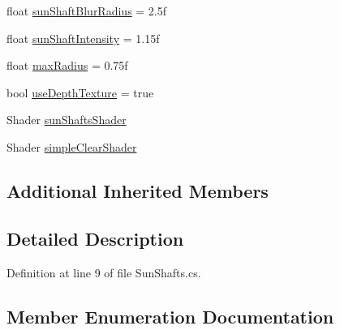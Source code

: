 \begin{DoxyCompactItemize}
float \mbox{\hyperlink{class_unity_standard_assets_1_1_image_effects_1_1_sun_shafts_a8bb5bab9e0ec911869fe77ccf5566d34}{sun\+Shaft\+Blur\+Radius}} = 2.\+5f
\item 
float \mbox{\hyperlink{class_unity_standard_assets_1_1_image_effects_1_1_sun_shafts_a7a45b2ff55145c73dbe893aeabff41ad}{sun\+Shaft\+Intensity}} = 1.\+15f
\item 
float \mbox{\hyperlink{class_unity_standard_assets_1_1_image_effects_1_1_sun_shafts_a2cccffc6bddcdc2fd32fbb6145bd408d}{max\+Radius}} = 0.\+75f
\item 
bool \mbox{\hyperlink{class_unity_standard_assets_1_1_image_effects_1_1_sun_shafts_ae9f2012110c36d04ac603df5317feb17}{use\+Depth\+Texture}} = true
\item 
Shader \mbox{\hyperlink{class_unity_standard_assets_1_1_image_effects_1_1_sun_shafts_a8e3768e277bb57d624799c8bd25b90e5}{sun\+Shafts\+Shader}}
\item 
Shader \mbox{\hyperlink{class_unity_standard_assets_1_1_image_effects_1_1_sun_shafts_a13cbc36500a9914640a900bd8c3936c9}{simple\+Clear\+Shader}}
\end{DoxyCompactItemize}
\subsection*{Additional Inherited Members}


\subsection{Detailed Description}


Definition at line 9 of file Sun\+Shafts.\+cs.



\subsection{Member Enumeration Documentation}
\mbox{\label{class_unity_standard_assets_1_1_image_effects_1_1_sun_shafts_a16577ac660a8afd1a280e59000343662}} 
